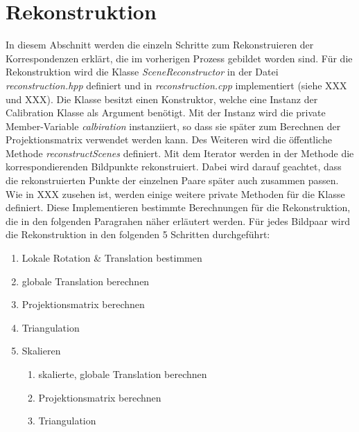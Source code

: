 \section{Rekonstruktion}\label{sec:implementation-reconstruction}

In diesem Abschnitt werden die einzeln Schritte zum Rekonstruieren der Korrespondenzen erklärt, die im vorherigen Prozess gebildet worden sind. 
Für die Rekonstruktion wird die Klasse \emph{SceneReconstructor} in der Datei \emph{reconstruction.hpp} definiert und in \emph{reconstruction.cpp} implementiert (siehe XXX und XXX). 
Die Klasse besitzt einen Konstruktor, welche eine Instanz der Calibration Klasse als Argument benötigt. 
Mit der Instanz wird die private Member-Variable \emph{calbiration} instanziiert, so dass sie später zum Berechnen der Projektionsmatrix verwendet werden kann.
Des Weiteren wird die öffentliche Methode \emph{reconstructScenes} definiert.
Mit dem Iterator werden in der Methode die korrespondierenden Bildpunkte rekonstruiert.
Dabei wird darauf geachtet, dass die rekonstruierten Punkte der einzelnen Paare später auch zusammen passen.
Wie in XXX zusehen ist, werden einige weitere private Methoden für die Klasse definiert.
Diese Implementieren bestimmte Berechnungen für die Rekonstruktion, die in den folgenden Paragrahen näher erläutert werden.
Für jedes Bildpaar wird die Rekonstruktion in den folgenden 5 Schritten durchgeführt:

\begin{enumerate}
    \item Lokale Rotation \& Translation bestimmen
    \item globale Translation berechnen
    \item Projektionsmatrix berechnen
    \item Triangulation
    \item Skalieren
        \begin{enumerate}
            \item skalierte, globale Translation berechnen
            \item Projektionsmatrix berechnen
            \item Triangulation
        \end{enumerate}
\end{enumerate}

